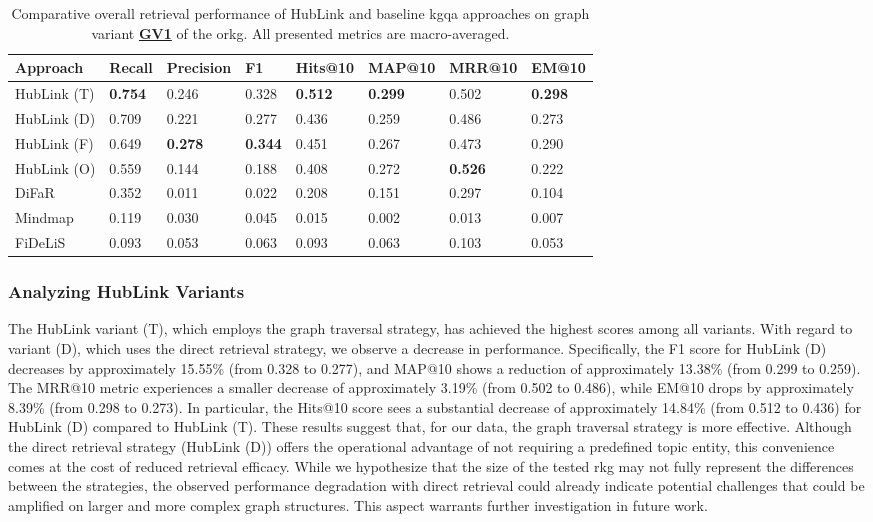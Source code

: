 \begin{table}[t]
\centering
\begin{tabular}{@{}llllllll@{}}
\toprule
Approach & Recall & Precision & F1 & Hits@10 & MAP@10 & MRR@10 & EM@10 \\ 
\midrule
HubLink (T) & \textbf{0.754} & 0.246 & 0.328 & \textbf{0.512} & \textbf{0.299} & 0.502 & \textbf{0.298}  \\ 
HubLink (D) & 0.709 & 0.221 & 0.277 & 0.436 & 0.259 & 0.486 & 0.273 \\ 
HubLink (F) & 0.649 & \textbf{0.278} & \textbf{0.344} & 0.451 & 0.267 & 0.473 & 0.290 \\ 
HubLink (O) & 0.559 & 0.144 & 0.188 & 0.408 & 0.272 & \textbf{0.526} & 0.222 \\ 
DiFaR & 0.352 & 0.011 & 0.022 & 0.208 & 0.151 & 0.297 & 0.104 \\ 
Mindmap & 0.119 & 0.030 & 0.045 & 0.015 & 0.002 & 0.013 & 0.007 \\ 
FiDeLiS & 0.093 & 0.053 & 0.063 & 0.093 & 0.063 & 0.103 & 0.053 \\ 
\bottomrule
\end{tabular}%
\caption[Comparative Retrieval Performance]{Comparative overall retrieval performance of HubLink and baseline \gls{kgqa} approaches on graph variant \hyperref[enum:gv1]{\textbf{GV1}} of the \gls{orkg}. All presented metrics are macro-averaged.}
\label{tab:q11:relevance_and_accuracy}
\end{table}

\subsubsection{Analyzing HubLink Variants}

The HubLink variant (T), which employs the graph traversal strategy, has achieved the highest scores among all variants. With regard to variant (D), which uses the direct retrieval strategy, we observe a decrease in performance. Specifically, the F1 score for HubLink (D) decreases by approximately 15.55\% (from 0.328 to 0.277), and MAP@10 shows a reduction of approximately 13.38\% (from 0.299 to 0.259). The MRR@10 metric experiences a smaller decrease of approximately 3.19\% (from 0.502 to 0.486), while EM@10 drops by approximately 8.39\% (from 0.298 to 0.273). In particular, the Hits@10 score sees a substantial decrease of approximately 14.84\% (from 0.512 to 0.436) for HubLink (D) compared to HubLink (T). These results suggest that, for our data, the graph traversal strategy is more effective. Although the direct retrieval strategy (HubLink (D)) offers the operational advantage of not requiring a predefined topic entity, this convenience comes at the cost of reduced retrieval efficacy. While we hypothesize that the size of the tested \gls{rkg} may not fully represent the differences between the strategies, the observed performance degradation with direct retrieval could already indicate potential challenges that could be amplified on larger and more complex graph structures. This aspect warrants further investigation in future work.

